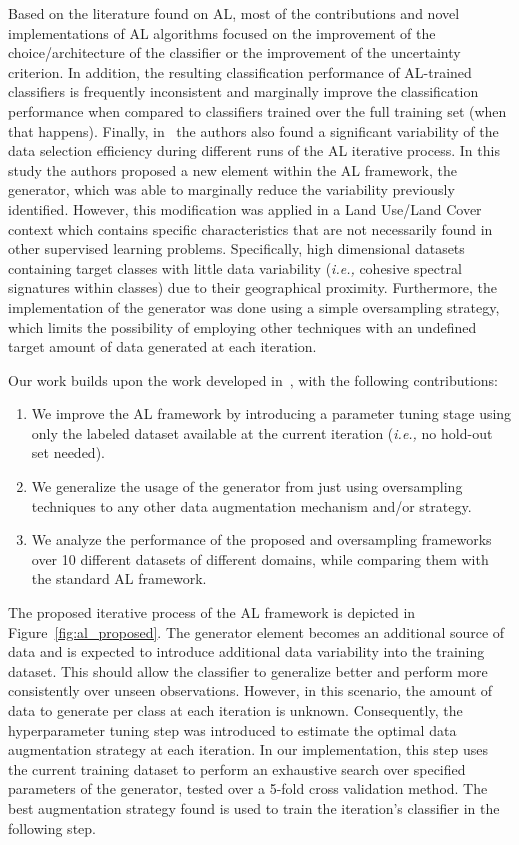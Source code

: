 \documentclass[parskip=full]{scrartcl}
\begin{document}
Based on the literature found on AL, most of the contributions and novel
implementations of AL algorithms focused on the improvement of the
choice/architecture of the classifier or the improvement of the uncertainty
criterion. In addition, the resulting classification performance of AL-trained
classifiers is frequently inconsistent and marginally improve the
classification performance when compared to classifiers trained over the full
training set (when that happens). Finally, in~\cite{Fonseca2021} the authors
also found a significant variability of the data selection efficiency during
different runs of the AL iterative process. In this study the authors proposed
a new element within the AL framework, the generator, which was able to
marginally reduce the variability previously identified. However, this
modification was applied in a Land Use/Land Cover context which contains
specific characteristics that are not necessarily found in other supervised
learning problems. Specifically, high dimensional datasets containing target
classes with little data variability (\textit{i.e.,} cohesive spectral
signatures within classes) due to their geographical proximity. Furthermore,
the implementation of the generator was done using a simple oversampling
strategy, which limits the possibility of employing other techniques with an
undefined target amount of data generated at each iteration.

Our work builds upon the work developed in~\cite{Fonseca2021}, with the
following contributions:

\begin{enumerate}
    \item We improve the AL framework by introducing a parameter
        tuning stage using only the labeled dataset available at the current
        iteration (\textit{i.e.,} no hold-out set needed).
    \item We generalize the usage of the generator from just using
        oversampling techniques to any other data augmentation mechanism
        and/or strategy.
    \item We analyze the performance of the proposed and oversampling
        frameworks over 10 different datasets of different domains, while
        comparing them with the standard AL framework.
\end{enumerate}

The proposed iterative process of the AL framework is depicted in
Figure~\ref{fig:al_proposed}. The generator element becomes an additional
source of data and is expected to introduce additional data variability into
the training dataset. This should allow the classifier to generalize better
and perform more consistently over unseen observations. However, in this
scenario, the amount of data to generate per class at each iteration is
unknown. Consequently, the hyperparameter tuning step was introduced to
estimate the optimal data augmentation strategy at each iteration. In our
implementation, this step uses the current training dataset to perform an
exhaustive search over specified parameters of the generator, tested over a
5-fold cross validation method. The best augmentation strategy found is used
to train the iteration's classifier in the following step.
\end{document}
